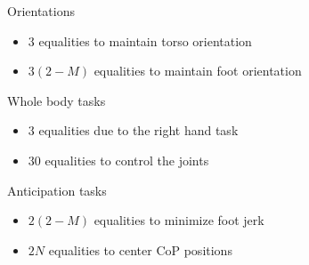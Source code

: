 \begin{hierarchy}
    \level Orientations
            \begin{itemize}%
                \item
                    $3$ equalities to maintain torso orientation
                \item
                    $3(2-M)$ equalities to maintain foot orientation
            \end{itemize}

    \level Whole body tasks
            \begin{itemize}%
                \item
                    $3$ equalities due to the right hand task

                \item
                    $30$ equalities to control the joints
            \end{itemize}

           Anticipation tasks
            \begin{itemize}%
                \item
                    $2 (2-M)$ equalities to minimize foot jerk

                \item
                    $2 N$ equalities to center \acs{CoP} positions


\end{itemize}
\end{hierarchy}
